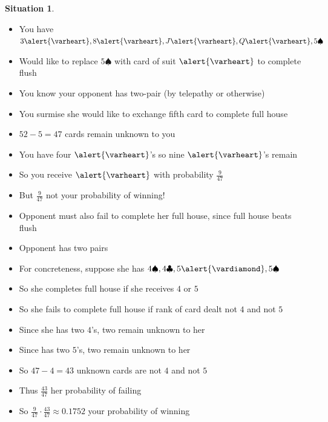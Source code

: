\documentclass[handout]{beamer}
\theoremstyle{definition}
\newtheorem{situation}{Situation}
\newcommand{\hs}{\alert{\varheart}}
\newcommand{\ds}{\alert{\vardiamond}}
\newcommand{\s}{\spadesuit}
\newcommand{\cs}{\clubsuit}
\begin{document}
\begin{frame}
\begin{situation}
\begin{itemize}
\item You have $3\hs,8\hs,J\hs,Q\hs,5\s$
\item Would like to replace $5\s$ with card of suit $\hs$ to complete flush
\item You know your opponent has two-pair (by telepathy or otherwise)
\item You surmise she would like to exchange fifth card to complete full house
\end{itemize}
\end{situation}
\begin{itemize}
\item $52-5=47$ cards remain unknown to you
\item You have four $\hs$'s so nine $\hs$'s remain
\item So you receive $\hs$ with probability $\frac{9}{47}$
\item But $\frac{9}{47}$ \alert{not} your probability of winning!
\item Opponent must also \alert{fail} to complete her full house,
since full house beats flush
\end{itemize}
\end{frame}

\begin{frame}
\begin{itemize}
\item Opponent has two pairs
\item For concreteness, suppose she has $4\s,4\cs,5\ds,5\s$
\item So she completes full house if she receives $4$ or $5$
\item So she \alert{fails} to complete full house
if rank of card dealt not $4$ \alert{and} not $5$
\item Since she has two $4$'s, two remain unknown to her
\item Since has two $5$'s, two remain unknown to her
\item So $47-4=43$ unknown cards are not $4$ and not $5$
\item Thus $\frac{43}{47}$ her probability of failing
\item So $\frac{9}{47}\cdot\frac{43}{47}\approx 0.1752$
your probability of winning
\end{itemize}
\end{frame}
\end{document}
